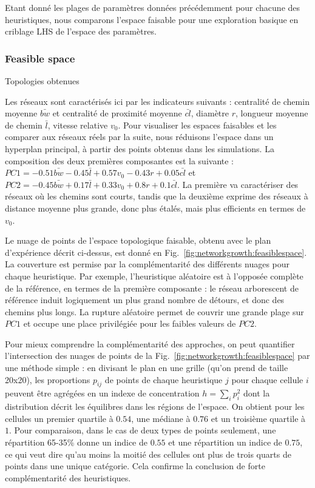 Etant donné les plages de paramètres données précédemment pour chacune des heuristiques, nous comparons l'espace faisable pour une exploration basique en criblage LHS de l'espace des paramètres.

\subsubsection{Feasible space}{Topologies obtenues}

Les réseaux sont caractérisés ici par les indicateurs suivants : centralité de chemin moyenne $\bar{bw}$ et centralité de proximité moyenne $\bar{cl}$, diamètre $r$, longueur moyenne de chemin $\bar{l}$, vitesse relative $v_0$. Pour visualiser les espaces faisables et les comparer aux réseaux réels par la suite, nous réduisons l'espace dans un hyperplan principal, à partir des points obtenus dans les simulations. La composition des deux premières composantes est la suivante : $PC1 = - 0.51 \bar{bw} - 0.45 \bar{l} + 0.57 v_0 - 0.43 r + 0.05 \bar{cl}$ et $PC2 = -0.45 \bar{bw} + 0.17 \bar{l} +0.33 v_0 + 0.8 r +0.1 \bar{cl}$. La première va caractériser des réseaux où les chemins sont courts, tandis que la deuxième exprime des réseaux à distance moyenne plus grande, donc plus étalés, mais plus efficients en termes de $v_0$. 

 
Le nuage de points de l'espace topologique faisable, obtenu avec le plan d'expérience décrit ci-dessus, est donné en Fig.~\ref{fig:networkgrowth:feasiblespace}. La couverture est permise par la complémentarité des différents nuages pour chaque heuristique. Par exemple, l'heuristique aléatoire est à l'opposée complète de la référence, en termes de la première composante : le réseau arborescent de référence induit logiquement un plus grand nombre de détours, et donc des chemins plus longs. La rupture aléatoire permet de couvrir une grande plage sur $PC1$ et occupe une place privilégiée pour les faibles valeurs de $PC2$.



Pour mieux comprendre la complémentarité des approches, on peut quantifier l'intersection des nuages de points de la Fig.~\ref{fig:networkgrowth:feasiblespace} par une méthode simple : en divisant le plan en une grille (qu'on prend de taille 20x20), les proportions $p_{ij}$ de points de chaque heuristique $j$ pour chaque cellule $i$ peuvent être agrégées en un indexe de concentration $h = \sum_i p_i^2$ dont la distribution décrit les équilibres dans les régions de l'espace. On obtient pour les cellules un premier quartile à $0.54$, une médiane à $0.76$ et un troisième quartile à $1$. Pour comparaison, dans le cas de deux types de points seulement, une répartition 65-35\% donne un indice de $0.55$ et une répartition un indice de $0.75$, ce qui veut dire qu'au moins la moitié des cellules ont plus de trois quarts de points dans une unique catégorie. Cela confirme la conclusion de forte complémentarité des heuristiques.


